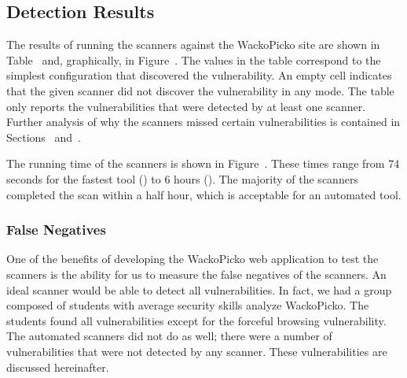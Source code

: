 


\subsection{Detection Results}
The results of running the scanners against the WackoPicko site are
shown in Table~ and, graphically, in
Figure~.
%
The values in the table correspond to the
simplest  configuration that discovered the vulnerability. An empty cell indicates that
the given scanner did not discover the vulnerability in any
mode. The table only reports the vulnerabilities that were detected by at least one scanner.
Further analysis of why the scanners missed
certain vulnerabilities is contained in Sections~
and~. 

The running time of the scanners is shown in Figure~.
These times range from 74 seconds for the fastest tool (\burp{}) to 6
hours (\nstalker{}). The majority of the scanners completed the
scan within a half hour, which is acceptable for an automated tool. 


\subsubsection{False Negatives}

One of the benefits of developing the WackoPicko web application to
test the scanners is the ability for us to measure the false negatives
of the scanners. An ideal scanner would be able to detect all
vulnerabilities. In fact, we had a group composed of students with 
average security skills 
analyze WackoPicko. The students found all vulnerabilities
except for the forceful browsing vulnerability. The automated
scanners did not do as well; there were a number of vulnerabilities
that were not detected by any scanner. These vulnerabilities are
discussed hereinafter.

